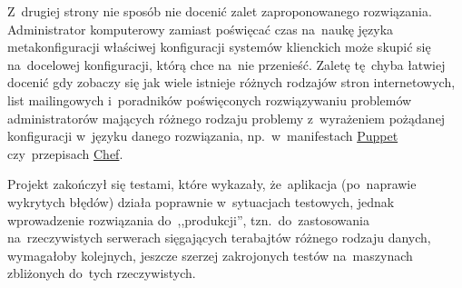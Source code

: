 \documentclass[thesis]{subfiles}
\begin{document}
Z~drugiej strony nie sposób nie docenić zalet zaproponowanego rozwiązania. Administrator komputerowy zamiast poświęcać czas na~naukę języka metakonfiguracji właściwej konfiguracji systemów klienckich może skupić się na~docelowej konfiguracji, którą chce na~nie przenieść. Zaletę tę~chyba łatwiej docenić gdy zobaczy się jak wiele istnieje różnych rodzajów stron internetowych, list mailingowych i~poradników poświęconych rozwiązywaniu problemów administratorów mających różnego rodzaju problemy z~wyrażeniem pożądanej konfiguracji w~języku danego rozwiązania, np.~w~manifestach \hyperref[sec:puppet]{Puppet} czy~przepisach \hyperref[sec:chef]{Chef}.

Projekt zakończył się testami, które wykazały, że~aplikacja (po~naprawie wykrytych błędów) działa poprawnie w~sytuacjach testowych, jednak wprowadzenie rozwiązania do~,,produkcji'', tzn.~do~zastosowania na~rzeczywistych serwerach sięgających terabajtów różnego rodzaju danych, wymagałoby kolejnych, jeszcze szerzej zakrojonych testów na~maszynach zbliżonych do~tych rzeczywistych.
\end{document}
